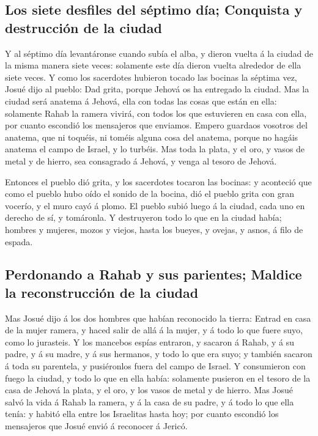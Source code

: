 \hypertarget{los-siete-desfiles-del-suxe9ptimo-duxeda-conquista-y-destrucciuxf3n-de-la-ciudad}{%
\subsection{Los siete desfiles del séptimo día; Conquista y destrucción
de la
ciudad}\label{los-siete-desfiles-del-suxe9ptimo-duxeda-conquista-y-destrucciuxf3n-de-la-ciudad}}

 Y al séptimo día levantáronse cuando subía el alba, y
dieron vuelta á la ciudad de la misma manera siete veces: solamente este
día dieron vuelta alrededor de ella siete veces.  Y como
los sacerdotes hubieron tocado las bocinas la séptima vez, Josué dijo al
pueblo: Dad grita, porque Jehová os ha entregado la ciudad.
 Mas la ciudad será anatema á Jehová, ella con todas las
cosas que están en ella: solamente Rahab la ramera vivirá, con todos los
que estuvieren en casa con ella, por cuanto escondió los mensajeros que
enviamos.  Empero guardaos vosotros del anatema, que ni
toquéis, ni toméis alguna cosa del anatema, porque no hagáis anatema el
campo de Israel, y lo turbéis.  Mas toda la plata, y el
oro, y vasos de metal y de hierro, sea consagrado á Jehová, y venga al
tesoro de Jehová.

 Entonces el pueblo dió grita, y los sacerdotes tocaron las
bocinas: y aconteció que como el pueblo hubo oído el sonido de la
bocina, dió el pueblo grita con gran vocerío, y el muro cayó á plomo. El
pueblo subió luego á la ciudad, cada uno en derecho de sí, y tomáronla.
 Y destruyeron todo lo que en la ciudad había; hombres y
mujeres, mozos y viejos, hasta los bueyes, y ovejas, y asnos, á filo de
espada.

\hypertarget{perdonando-a-rahab-y-sus-parientes-maldice-la-reconstrucciuxf3n-de-la-ciudad}{%
\subsection{Perdonando a Rahab y sus parientes; Maldice la
reconstrucción de la
ciudad}\label{perdonando-a-rahab-y-sus-parientes-maldice-la-reconstrucciuxf3n-de-la-ciudad}}

 Mas Josué dijo á los dos hombres que habían reconocido la
tierra: Entrad en casa de la mujer ramera, y haced salir de allá á la
mujer, y á todo lo que fuere suyo, como lo jurasteis.  Y
los mancebos espías entraron, y sacaron á Rahab, y á su padre, y á su
madre, y á sus hermanos, y todo lo que era suyo; y también sacaron á
toda su parentela, y pusiéronlos fuera del campo de Israel.
 Y consumieron con fuego la ciudad, y todo lo que en ella
había: solamente pusieron en el tesoro de la casa de Jehová la plata, y
el oro, y los vasos de metal y de hierro.  Mas Josué salvó
la vida á Rahab la ramera, y á la casa de su padre, y á todo lo que ella
tenía: y habitó ella entre los Israelitas hasta hoy; por cuanto escondió
los mensajeros que Josué envió á reconocer á Jericó.

